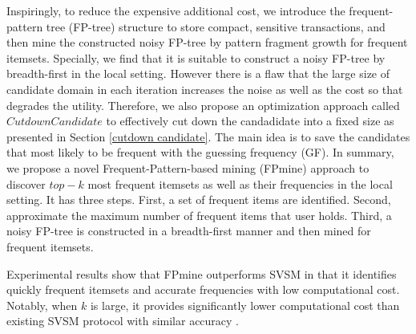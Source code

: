 \documentclass[conference]{IEEEtran}
\begin{document}
Inspiringly, to reduce the expensive additional cost, we introduce the frequent-pattern tree (FP-tree)\cite{fp} structure to store compact, sensitive transactions, and then mine the constructed noisy FP-tree by pattern fragment growth for frequent itemsets. Specially, we find that it is suitable to construct a noisy FP-tree by breadth-first in the local setting. However there is a flaw that the large size of candidate domain in each iteration increases the noise as well as the cost so that degrades the utility. Therefore, we also propose an optimization approach called $CutdownCandidate$ to effectively cut down the candadidate into a fixed size as presented in Section \ref{cutdown candidate}. The main idea is to save the candidates that most likely to be frequent with the guessing frequency (GF). In summary, we propose a novel {\color{red}Frequent-Pattern-based mining (FPmine)} approach to discover $top-k$ most frequent itemsets as well as their frequencies in the local setting. {\color{red}It has three steps. First, a set of frequent items are identified. Second, approximate the maximum number of frequent items that user holds. Third, a noisy FP-tree is constructed in a breadth-first manner and then mined for frequent itemsets.}

Experimental results show that {\color{red}FPmine outperforms SVSM in that it identifies quickly frequent itemsets and accurate frequencies with low computational cost. Notably, when $k$ is large, it provides significantly lower computational cost than existing SVSM protocol with similar accuracy .}
\end{document}

